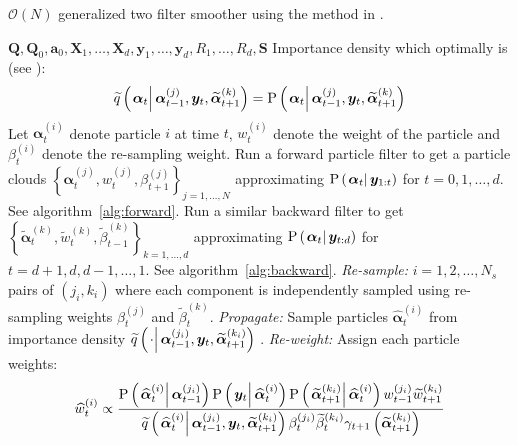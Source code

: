 \documentclass[9pt, notitlepage]{article}
\newcommand\StateXX{\Statex\hspace{\algorithmicindent}\hspace{\algorithmicindent}}
\renewcommand{\vec}[1]{\bm{#1}}
\newcommand{\mat}[1]{\mathbf{#1}}
\newcommand{\Lbrace}[1]{\left\{ #1\right\}}
\newcommand{\Lparen}[1]{\left( #1\right)}
\newcommand{\Cond}[2]{\left. #1 \vphantom{#2} \right\vert  #2}
\newcommand{\Prob}{\text{P}}
\newcommand{\optor}[2]{#1\Lparen{#2}}
\newcommand{\optorC}[3]{\optor{#1}{\Cond{#2}{#3}}}
\newcommand{\propC}[2]{\optorC{\Prob}{#1}{#2}}
\newcommand{\IDAproxC}[2]{\optorC{\widetilde{q}}{#1}{#2}}
\newcommand{\partic}[3]{#1_{#2}^{\Lparen{#3}}}
\newcommand{\particB}[3]{\widetilde{#1}_{#2}^{\Lparen{#3}}}
\newcommand{\particS}[3]{\widehat{#1}_{#2}^{\Lparen{#3}}}
\newcommand{\bigO}[1]{\mathcal{O}\Lparen{#1}}
\newcommand{\nPart}{N}
\newcommand{\nPeriods}{d}
\begin{document}
\begin{algorithm}[H]
\caption{$\bigO{\nPart}$ generalized two filter smoother using the method in \cite{fearnhead10}.}\label{alg:ONsmoother}
\begin{algorithmic}[1]\raggedright
\INPUT
\Statex $\mat{Q},\mat{Q}_0,\vec{a}_0,\mat{X}_1,\dots,\mat{X}_d,\vec{y}_1,\dots,\vec{y}_d,R_1,\dots,R_d,\mat{S}$
%
\Statex Importance density which optimally is (see \citet[page 453]{fearnhead10}):
\Statex \begin{equation}
	\IDAproxC{\vec{\alpha}_t}{\partic{\vec{\alpha}}{t-1}{j},\vec{y}_t, \particB{\vec{\alpha}}{t+1}{k}} =
%
	\propC{\vec{\alpha}_t}{\partic{\vec{\alpha}}{t-1}{j},\vec{y}_t, \particB{\vec{\alpha}}{t+1}{k}}
\end{equation}
%
%
\Statex Let $\partic{\vec{\alpha}}{t}{i}$ denote particle $i$ at time $t$, $\partic{w}{t}{i}$ denote the weight of the particle and $\partic{\beta}{t}{i}$ denote the re-sampling weight.
%
\State Run a forward particle filter to get a particle clouds %
	$\Lbrace{\partic{\vec{\alpha}}{t}{j}, \partic{w}{t}{j}, \partic{\beta}{t + 1}{j}}_{j=1,\dots,\nPart}$ %
	approximating $\propC{\vec{\alpha}_t}{\vec{y}_{1:t}}$ for $t = 0, 1, \dots, \nPeriods$. See algorithm~\ref{alg:forward}.
\EndProcedure
%
\State Run a similar backward filter to get %
	$\Lbrace{\particB{\vec{\alpha}}{t}{k}, \particB{w}{t}{k}, \particB{\beta}{t - 1}{k}}_{k=1,\dots,\nPeriods}$  %
	approximating $\propC{\vec{\alpha}_t}{\vec{y}_{t:\nPeriods}}$ for $t = \nPeriods + 1, \nPeriods, \nPeriods - 1, \dots, 1$. See algorithm~\ref{alg:backward}.
\EndProcedure
%
\For{$t=1,\dots, \nPart$}
\StateXX \emph{Re-sample:}
\State $i=1,2,\dots,\nPart_s$ pairs of $\Lparen{j_i, k_i}$ where each component is independently sampled using re-sampling weights $\partic{\beta}{t}{j}$ and $\particB{\beta}{t}{k}$.
%
\StateXX \emph{Propagate:}
\State Sample particles $\particS{\vec{\alpha}}{t}{i}$ from importance density %
	$\IDAproxC{\cdot}{\partic{\vec{\alpha}}{t-1}{j_i},\vec{y}_t, \particB{\vec{\alpha}}{t + 1}{k_i}}$%
.%
\StateXX \emph{Re-weight:}
\State Assign each particle weights:
\StateXX \begin{equation}\label{eqn:combineWeight}
 \particS{w}{t}{i} \propto \frac{
 	\propC{\particS{\vec{\alpha}}{t}{i}}{\partic{\vec{\alpha}}{t - 1}{j_i}}
 	\propC{\vec{y}_t}{\particS{\vec{\alpha}}{t}{i}}
 	\propC{\particB{\vec{\alpha}}{t + 1}{k_i}}{\particS{\vec{\alpha}}{t}{i}}
 	\partic{w}{t - 1}{j_i}\particB{w}{t + 1}{k_i}
 	}{ %
 	\IDAproxC{\particS{\vec{\alpha}}{t}{i}}{\partic{\vec{\alpha}}{t-1}{j_i},\vec{y}_t, \particB{\vec{\alpha}}{t+1}{k_i}}
 	\partic{\beta}{t}{j_i}\particB{\beta}{t}{k_i}\gamma_{t +1}\Lparen{\particB{\vec{\alpha}}{t+1}{k_i}}
 	} %
\end{equation}
\EndFor
\EndProcedure
\end{algorithmic}
\end{algorithm}
\end{document}
